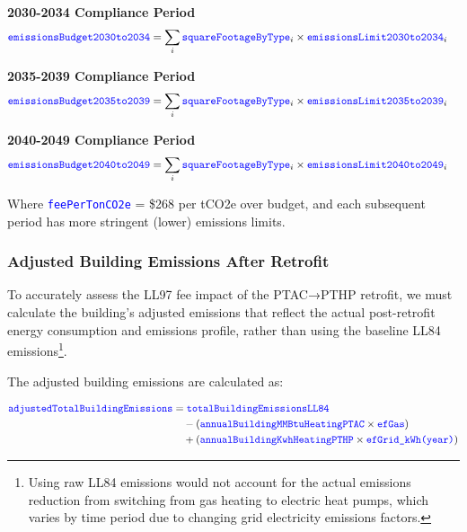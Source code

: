 \documentclass{article}
\newcommand{\code}[1]{\textcolor{blue}{\texttt{#1}}}
\begin{document}
\textbf{2030-2034 Compliance Period}
\begin{align}
\code{emissionsBudget2030to2034} &= \sum_{i} \code{squareFootageByType}_i \times \code{emissionsLimit2030to2034}_i
\end{align}

\textbf{2035-2039 Compliance Period}
\begin{align}
\code{emissionsBudget2035to2039} &= \sum_{i} \code{squareFootageByType}_i \times \code{emissionsLimit2035to2039}_i
\end{align}

\textbf{2040-2049 Compliance Period}
\begin{align}
\code{emissionsBudget2040to2049} &= \sum_{i} \code{squareFootageByType}_i \times \code{emissionsLimit2040to2049}_i
\end{align}

Where \code{feePerTonCO2e} = \$268 per tCO2e over budget, and each subsequent period has more stringent (lower) emissions limits.

\subsubsection{Adjusted Building Emissions After Retrofit}

To accurately assess the LL97 fee impact of the PTAC→PTHP retrofit, we must calculate the building's adjusted emissions that reflect the actual post-retrofit energy consumption and emissions profile, rather than using the baseline LL84 emissions\footnote{Using raw LL84 emissions would not account for the actual emissions reduction from switching from gas heating to electric heat pumps, which varies by time period due to changing grid electricity emissions factors.}.

The adjusted building emissions are calculated as:

\begin{align}
\code{adjustedTotalBuildingEmissions} &= \code{totalBuildingEmissionsLL84} \nonumber \\
&\quad - (\code{annualBuildingMMBtuHeatingPTAC} \times \code{efGas}) \nonumber \\
&\quad + (\code{annualBuildingKwhHeatingPTHP} \times \code{efGrid\_kWh(year)})
\end{align}
\end{document}
